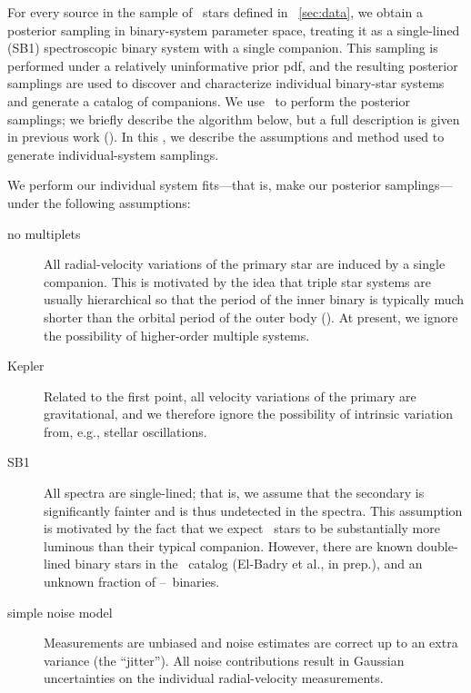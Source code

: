 \documentclass[modern, letterpaper]{aastex61}
\newcommand{\apogee}{\project{\acronym{APOGEE}}}
\newcommand{\thejoker}{\project{The~Joker}}
\newcommand{\RGB}{\acronym{RGB}}
\begin{document}
For every source in the sample of \apogee\ stars defined in
\sectionname~\ref{sec:data}, we obtain a posterior sampling in binary-system
parameter space, treating it as a single-lined (SB1) spectroscopic binary system
with a single companion.
This sampling is performed under a relatively uninformative prior pdf, and the
resulting posterior samplings are used to discover and characterize individual
binary-star systems and generate a catalog of companions.
We use \thejoker\ to perform the posterior samplings; we briefly describe the
algorithm below, but a full description is given in previous work
(\citealt{Price-Whelan:2017}).
In this \sectionname, we describe the assumptions and method used to generate
individual-system samplings.

We perform our individual system fits---that is, make our posterior
samplings---under the following assumptions:
\begin{description}
\item[no multiplets] All radial-velocity variations of the primary star are
  induced by a single companion.
  This is motivated by the idea that triple star systems are usually
  hierarchical so that the period of the inner binary is typically much shorter
  than the orbital period of the outer body ().
  At present, we ignore the possibility of higher-order multiple systems.
\item[Kepler] Related to the first point, all velocity variations of the primary
  are gravitational, and we therefore ignore the possibility of intrinsic
  variation from, e.g., stellar oscillations.
\item[SB1] All spectra are single-lined; that is, we assume that the secondary
  is significantly fainter and is thus undetected in the spectra.
  This assumption is motivated by the fact that we expect \RGB\ stars to be
  substantially more luminous than their typical companion.
  However, there are known double-lined binary stars in the \apogee\ catalog
  (El-Badry et al., in prep.), and an unknown fraction of \RGB--\RGB\ binaries.
\item[simple noise model] Measurements are unbiased and noise estimates are
  correct up to an  extra variance (the ``jitter'').
  All noise contributions result in Gaussian uncertainties on the individual
  radial-velocity measurements.
\end{description}
\end{document}
